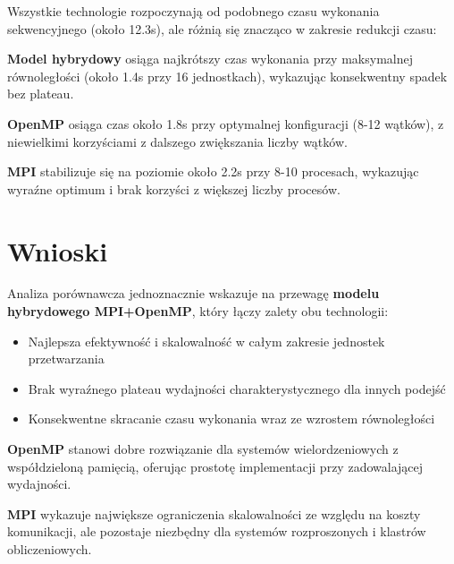 \documentclass[12pt,a4paper]{report}
\begin{document}
Wszystkie technologie rozpoczynają od podobnego czasu wykonania sekwencyjnego (około 12.3s), ale różnią się znacząco w zakresie redukcji czasu:

\textbf{Model hybrydowy} osiąga najkrótszy czas wykonania przy maksymalnej równoległości (około 1.4s przy 16 jednostkach), wykazując konsekwentny spadek bez plateau.

\textbf{OpenMP} osiąga czas około 1.8s przy optymalnej konfiguracji (8-12 wątków), z niewielkimi korzyściami z dalszego zwiększania liczby wątków.

\textbf{MPI} stabilizuje się na poziomie około 2.2s przy 8-10 procesach, wykazując wyraźne optimum i brak korzyści z większej liczby procesów.

\section{Wnioski}

Analiza porównawcza jednoznacznie wskazuje na przewagę \textbf{modelu hybrydowego MPI+OpenMP}, który łączy zalety obu technologii:
\begin{itemize}
    \item Najlepsza efektywność i skalowalność w całym zakresie jednostek przetwarzania
    \item Brak wyraźnego plateau wydajności charakterystycznego dla innych podejść
    \item Konsekwentne skracanie czasu wykonania wraz ze wzrostem równoległości
\end{itemize}

\textbf{OpenMP} stanowi dobre rozwiązanie dla systemów wielordzeniowych z współdzieloną pamięcią, oferując prostotę implementacji przy zadowalającej wydajności.

\textbf{MPI} wykazuje największe ograniczenia skalowalności ze względu na koszty komunikacji, ale pozostaje niezbędny dla systemów rozproszonych i klastrów obliczeniowych.
\end{document}
